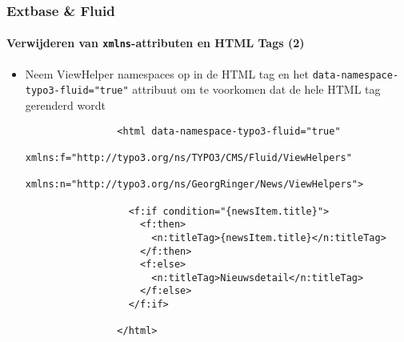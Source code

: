 \begin{frame}[fragile]
	\frametitle{Extbase \& Fluid}
	\framesubtitle{Verwijderen van \texttt{xmlns}-attributen en HTML Tags (2)}

	\lstset{basicstyle=\tiny\ttfamily}

	\begin{itemize}

		\item Neem ViewHelper namespaces op in de HTML tag en het
			\texttt{data-namespace-typo3-fluid="true"} attribuut om te voorkomen dat de hele
			HTML tag gerenderd wordt

			\begin{lstlisting}
				<html data-namespace-typo3-fluid="true"
				  xmlns:f="http://typo3.org/ns/TYPO3/CMS/Fluid/ViewHelpers"
				  xmlns:n="http://typo3.org/ns/GeorgRinger/News/ViewHelpers">

				  <f:if condition="{newsItem.title}">
				    <f:then>
				      <n:titleTag>{newsItem.title}</n:titleTag>
				    </f:then>
				    <f:else>
				      <n:titleTag>Nieuwsdetail</n:titleTag>
				    </f:else>
				  </f:if>

				</html>
			\end{lstlisting}

	\end{itemize}

\end{frame}


